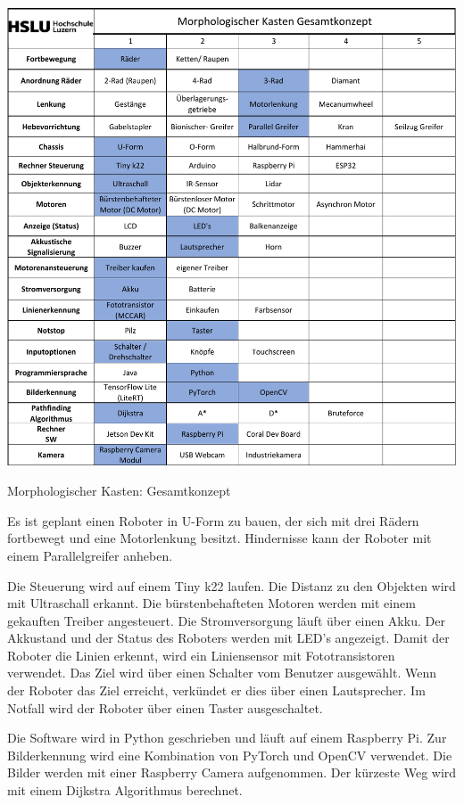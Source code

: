 \begin{table}[H]
\centering
\includegraphics[width=\textwidth -20mm]{assets/MK-all.pdf}
\caption{Morphologischer Kasten: Gesamtkonzept}
\label{table:mk-all}
\end{table}

Es ist geplant einen Roboter in U-Form zu bauen, der sich mit drei Rädern fortbewegt und eine Motorlenkung besitzt. Hindernisse kann der Roboter mit einem Parallelgreifer anheben.

Die Steuerung wird auf einem Tiny k22 laufen. Die Distanz zu den Objekten wird mit Ultraschall erkannt. Die bürstenbehafteten Motoren werden mit einem gekauften Treiber angesteuert. Die Stromversorgung läuft über einen Akku. Der Akkustand und der Status des Roboters werden mit LED's angezeigt. Damit der Roboter die Linien erkennt, wird ein Liniensensor mit Fototransistoren verwendet. Das Ziel wird über einen Schalter vom Benutzer ausgewählt.
Wenn der Roboter das Ziel erreicht, verkündet er dies über einen Lautsprecher. Im Notfall wird der Roboter über einen Taster ausgeschaltet.

Die Software wird in Python geschrieben und läuft auf einem Raspberry Pi. Zur Bilderkennung wird eine Kombination von PyTorch und OpenCV verwendet. Die Bilder werden mit einer Raspberry Camera aufgenommen. Der kürzeste Weg wird mit einem Dijkstra Algorithmus berechnet.





